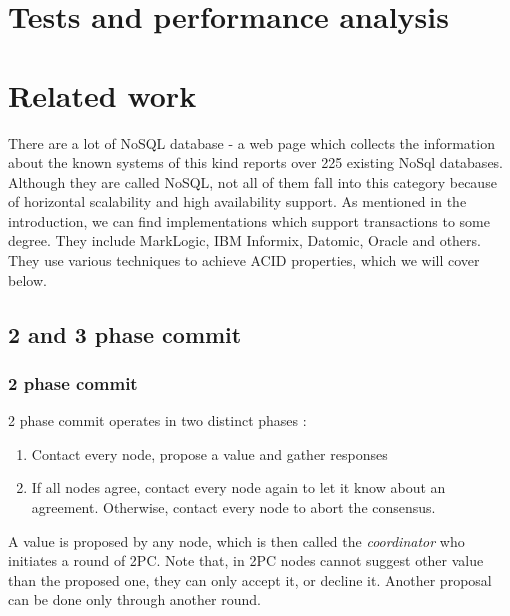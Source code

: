 \documentclass[runningheads,a4paper]{llncs}
\begin{document}

\section{Tests and performance analysis}

\section{Related work}

There are a lot of NoSQL database - a web page which collects the information about the known systems of this kind \cite{NoSqlDatabasesOrg} reports over 225 existing NoSql databases. Although they are called NoSQL, not all of them fall into this category because of horizontal scalability and high availability support. As mentioned in the introduction, we can find implementations which support transactions to some degree. They include MarkLogic, IBM Informix, Datomic, Oracle and others. They use various techniques to achieve ACID properties, which we will cover below. 

\subsection{2 and 3 phase commit}
\subsubsection{2 phase commit}
2 phase commit operates in two distinct phases \cite{Bernstein:1987}: 
\begin{enumerate} 
	\item Contact every node, propose a value and gather responses 
	\item If all nodes agree, contact every node again to let it know about an
	agreement. Otherwise, contact every node to abort the consensus. 
\end{enumerate}

A value is proposed by any node, which is then called the \emph{coordinator} who initiates a round of 2PC. Note that, in 2PC nodes cannot suggest other value than the proposed one, they can only accept it, or decline it. Another proposal can be done only through another round. 
\end{document}
